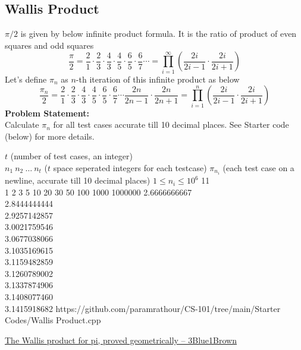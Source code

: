 \subsection{Wallis Product}{\label{pp:wallis}}
$\pi/2$ is given by below infinite product formula. It is the ratio of product of even squares and odd squares
\begin{equation}
\frac{\pi}{2} = {\frac {2}{1}}\cdot {\frac {2}{3}}\cdot {\frac {4}{3}}\cdot {\frac {4}{5}}\cdot {\frac {6}{5}}\cdot {\frac {6}{7}}\cdots= \prod _{i=1}^{\infty}\left({\frac {2i}{2i-1}}\cdot {\frac {2i}{2i+1}}\right)
\end{equation}
Let's define $\pi_n$ as $n$-th iteration of this infinite product as below
\begin{equation*}
\frac{\pi_n}{2} = {\frac {2}{1}}\cdot {\frac {2}{3}}\cdot {\frac {4}{3}}\cdot {\frac {4}{5}}\cdot {\frac {6}{5}}\cdot {\frac {6}{7}}\cdots{\frac {2n}{2n-1}}\cdot {\frac {2n}{2n+1}} = \prod _{i=1}^{n}\left({\frac {2i}{2i-1}}\cdot {\frac {2i}{2i+1}}\right)
\end{equation*}
\textbf{Problem Statement:}\\
Calculate $\pi_n$ for all test cases accurate till 10 decimal places. See Starter code (below) for more details.
\begin{testcases}
	{$t$ \hfill(number of test cases, an integer)\\$n_1\ n_2\ \ldots\ n_t$ \hfill($t$ space seperated integers for each testcase)}
	{$\pi_{n_i}$ \hfill(each test case on a newline, accurate till 10 decimal places)}
	{$1 \leq n_i \leq 10^{6}$}
	{11\\1 2 3 5 10 20 30 50 100 1000 1000000}
	{2.6666666667\\2.8444444444\\2.9257142857\\3.0021759546\\3.0677038066\\3.1035169615\\3.1159482859\\3.1260789002\\3.1337874906\\3.1408077460\\3.1415918682}
	{https://github.com/paramrathour/CS-101/tree/main/Starter Codes/Wallis Product.cpp}
\end{testcases}
\begin{funvideo}
\href{https://youtu.be/8GPy_UMV-08}{The Wallis product for pi, proved geometrically -- 3Blue1Brown}
\end{funvideo}
